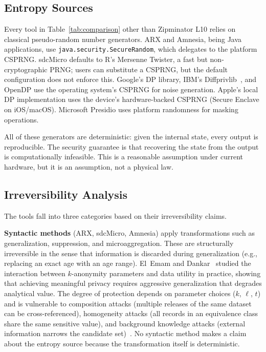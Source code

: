\documentclass[journal]{IEEEtran}
\begin{document}
\subsection{Entropy Sources}
\label{subsec:entropy_sources}

Every tool in Table~\ref{tab:comparison} other than Zipminator L10 relies on classical pseudo-random number generators. ARX and Amnesia, being Java applications, use \texttt{java.security.\allowbreak SecureRandom}, which delegates to the platform CSPRNG. sdcMicro defaults to R's Mersenne Twister, a fast but non-cryptographic PRNG; users can substitute a CSPRNG, but the default configuration does not enforce this. Google's DP library, IBM's Diffprivlib~\cite{holohan2019diffprivlib}, and OpenDP use the operating system's CSPRNG for noise generation. Apple's local DP implementation uses the device's hardware-backed CSPRNG (Secure Enclave on iOS/macOS). Microsoft Presidio uses platform randomness for masking operations.

All of these generators are deterministic: given the internal state, every output is reproducible. The security guarantee is that recovering the state from the output is computationally infeasible. This is a reasonable assumption under current hardware, but it is an assumption, not a physical law.

\subsection{Irreversibility Analysis}
\label{subsec:irrev_analysis}

The tools fall into three categories based on their irreversibility claims.

\textbf{Syntactic methods} (ARX, sdcMicro, Amnesia) apply transformations such as generalization, suppression, and microaggregation. These are structurally irreversible in the sense that information is discarded during generalization (e.g., replacing an exact age with an age range). El~Emam and Dankar~\cite{elemam2008kanon} studied the interaction between $k$-anonymity parameters and data utility in practice, showing that achieving meaningful privacy requires aggressive generalization that degrades analytical value. The degree of protection depends on parameter choices ($k$, $\ell$, $t$) and is vulnerable to composition attacks (multiple releases of the same dataset can be cross-referenced), homogeneity attacks (all records in an equivalence class share the same sensitive value), and background knowledge attacks (external information narrows the candidate set)~\cite{machanavajjhala2007ldiv, li2007tcloseness}. No syntactic method makes a claim about the entropy source because the transformation itself is deterministic.
\end{document}
